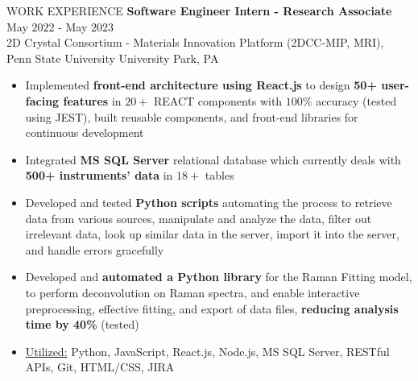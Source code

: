 \documentclass{resume} %
\begin{document}
\begin{rSection}{WORK EXPERIENCE}
{\bf Software Engineer Intern - Research Associate} \hfill May $2022$ - May $2023$\\
2D Crystal Consortium - Materials Innovation Platform (2DCC-MIP, MRI), Penn State University \hfill University Park, PA
\begin{itemize}[itemsep = -4pt]
    \item Implemented {\bf front-end architecture using React.js} to design {\bf 50+ user-facing features} in $20+$ REACT components with $100\%$ accuracy (tested using JEST), built reusable components, and front-end libraries for continuous development
    \item Integrated {\bf MS SQL Server} relational database which currently deals with {\bf 500+ instruments' data} in $18+$ tables
    \item Developed and tested {\bf Python scripts} automating the process to retrieve data from various sources, manipulate and analyze the data, filter out irrelevant data, look up similar data in the server, import it into the server, and handle errors gracefully
    \item Developed and {\bf automated a Python library} for the Raman Fitting model, to perform deconvolution on Raman spectra, and enable interactive preprocessing, effective fitting, and export of data files, {\bf reducing analysis time by 40\%} (tested)
    \item \underline{Utilized:} Python, JavaScript, React.js, Node.js, MS SQL Server, RESTful APIs, Git, HTML/CSS, JIRA
\end{itemize}

\end{rSection} 


\end{document}
